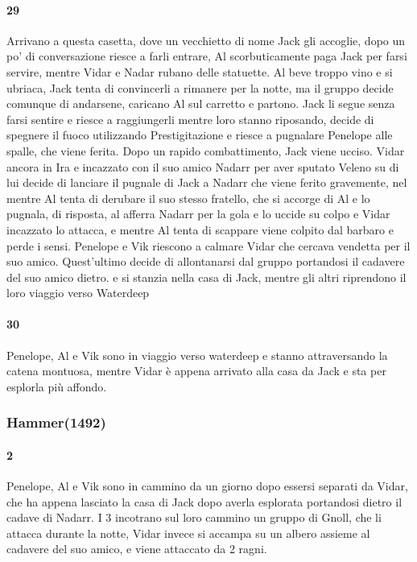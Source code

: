 \documentclass{article}
\begin{document}
                  \paragraph{29} Arrivano a questa casetta, dove un vecchietto di nome Jack gli accoglie, dopo un po' di conversazione riesce a farli entrare, Al scorbuticamente paga Jack per farsi servire, mentre Vidar e Nadar rubano delle statuette. Al beve troppo vino e si ubriaca, Jack tenta di convincerli a rimanere per la notte, ma il gruppo decide comunque di andarsene, caricano Al sul carretto e partono. Jack li segue senza farsi sentire e riesce a raggiungerli mentre loro stanno riposando, decide di spegnere il fuoco utilizzando Prestigitazione e riesce a pugnalare Penelope alle spalle, che viene ferita. Dopo un rapido combattimento, Jack viene ucciso.
Vidar ancora in Ira e incazzato con il suo amico Nadarr per aver sputato Veleno su di lui decide di lanciare il pugnale di Jack a Nadarr che viene ferito gravemente, nel mentre Al tenta di derubare il suo stesso fratello, che si accorge di Al e lo pugnala, di risposta, al afferra Nadarr per la gola e lo uccide su colpo e Vidar incazzato lo attacca, e mentre Al tenta di scappare viene colpito dal barbaro e perde i sensi. Penelope e Vik riescono a calmare Vidar che cercava vendetta per il suo amico. Quest'ultimo decide di allontanarsi dal gruppo portandosi il cadavere del suo amico dietro.  e si stanzia nella casa di Jack, mentre gli altri riprendono il loro viaggio verso Waterdeep
                  \paragraph{30} Penelope, Al e Vik sono in viaggio verso waterdeep e stanno attraversando la catena montuosa, mentre Vidar è appena arrivato alla casa da Jack e sta per esplorla più affondo.
              \subsubsection{Hammer(1492)}
                  \paragraph{2} Penelope, Al e Vik sono in cammino da un giorno dopo essersi separati da Vidar, che ha appena lasciato la casa di Jack dopo averla esplorata portandosi dietro il cadave di Nadarr. I 3 incotrano sul loro cammino un gruppo di Gnoll, che li attacca durante la notte, Vidar invece si accampa su un albero assieme al cadavere del suo amico, e viene attaccato da 2 ragni. 
\end{document}
